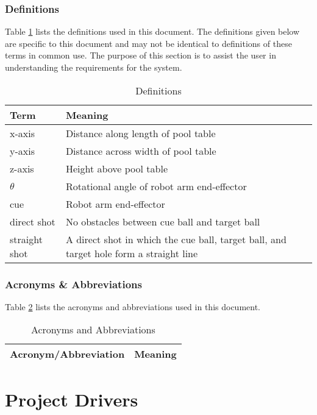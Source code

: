 \documentclass[titlepage]{article}
\begin{document}
\subsubsection{Definitions}
Table \ref{tab:Definitions} lists the definitions used in this document. The definitions given below are specific to this document and may not be identical to definitions of these terms in common use. The purpose of this section is to assist the user in understanding the requirements for the system.
\begin{table}[h!]
\centering
\caption{Definitions}
    \begin{tabular}{| p{6cm} | p{6cm} |}\hline
    \textbf{Term}	&\textbf{Meaning}\\\hline
	x-axis					&Distance along length of pool table\\\hline
	y-axis					&Distance across width of pool table\\\hline
	z-axis					&Height above pool table\\\hline
	$\theta$				&Rotational angle of robot arm end-effector\\\hline
	cue 					&Robot arm end-effector\\\hline
	direct shot				&No obstacles between cue ball and target ball\\\hline
	straight shot			&A direct shot in which the cue ball, target ball, and target hole form a straight line\\\hline
    \end{tabular}
\label{tab:Definitions}
\end{table}

\subsubsection{Acronyms \& Abbreviations}
Table \ref{tab:Acronyms} lists the acronyms and abbreviations used in this document.
\begin{table}[h!]
\centering
\caption{Acronyms and Abbreviations}
    \begin{tabular}{| p{6cm} | p{6cm} |}\hline
    \textbf{Acronym/Abbreviation} &\textbf{Meaning}\\\hline
    \end{tabular}
\label{tab:Acronyms}
\end{table}


\section{Project Drivers}
\end{document}
